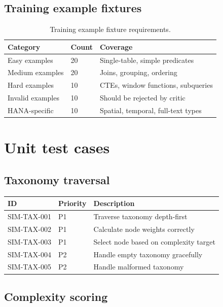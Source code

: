 \subsection{Training example fixtures}

\begin{table}[htbp]
\centering
\caption{Training example fixture requirements.}
\footnotesize
\begin{tabularx}{\linewidth}{@{}l l X@{}}
\toprule
\textbf{Category} & \textbf{Count} & \textbf{Coverage} \\ \midrule
Easy examples & 20 & Single-table, simple predicates \\
Medium examples & 20 & Joins, grouping, ordering \\
Hard examples & 10 & CTEs, window functions, subqueries \\
Invalid examples & 10 & Should be rejected by critic \\
HANA-specific & 10 & Spatial, temporal, full-text types \\
\bottomrule
\end{tabularx}
\end{table}

\section{Unit test cases}

\subsection{Taxonomy traversal}

\begin{tabularx}{\linewidth}{@{}l l X@{}}
\toprule
\textbf{ID} & \textbf{Priority} & \textbf{Description} \\ \midrule
SIM-TAX-001 & P1 & Traverse taxonomy depth-first \\
SIM-TAX-002 & P1 & Calculate node weights correctly \\
SIM-TAX-003 & P1 & Select node based on complexity target \\
SIM-TAX-004 & P2 & Handle empty taxonomy gracefully \\
SIM-TAX-005 & P2 & Handle malformed taxonomy \\
\bottomrule
\end{tabularx}

\subsection{Complexity scoring}

